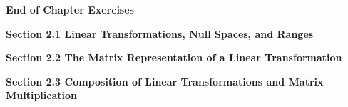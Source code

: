 \documentclass[11pt,largemargins]{homework}
\begin{document}
\maketitle

\textbf{\large{End of Chapter Exercises}}

\hfill

\textbf{\large{Section 2.1} Linear Transformations, Null Spaces, and Ranges}
\question

\question

\question

\question

\question

\question

\question

\question

\question

\question


\textbf{\large{Section 2.2} The Matrix Representation of a Linear Transformation}
\setcounter{questionCounter}{0}
\question

\question

\question

\question

\question

\question

\question

\question

\question

\question

\textbf{\large{Section 2.3} Composition of Linear Transformations and Matrix Multiplication}
\setcounter{questionCounter}{0}
\question

\question

\question

\question

\question

\question

\question

\question

\question

\question
\end{document}
